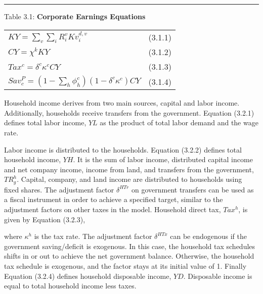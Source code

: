 \documentclass[12pt]{article}
\begin{document}
\newpage

\noindent\rule{\linewidth}{0.4pt}
\begin{center}
\begin{large}
{\centering Table 3.1: \textbf{Corporate Earnings Equations} \par}

\begin{tabular}{>{\raggedright}p{} l}

$KY = \displaystyle \sum_v \sum_i R^v_i Kv^{d, v}_i$ & (3.1.1)\\[15pt]

$CY = \chi^k K\!Y$ & (3.1.2)\\[15pt]

$Tax^c = \delta^c\kappa^cCY$ & (3.1.3) \\[15pt]

$Sav^P_c = \left(1- \displaystyle \sum_h \phi^c_h \right)(1-\delta^c\kappa^c)CY$ & (3.1.4) \\[15pt]
\hline
\end{tabular}
\end{large}
\end{center}

Household income derives from two main sources, capital and labor income. Additionally, households receive transfers from the government. Equation (3.2.1) defines total labor income, $YL$ as the product of total labor demand and the wage rate.

Labor income is distributed to the households. Equation (3.2.2) defines total household income, $YH$. It is the sum of labor income, distributed capital income and net company income, income from land, and transfers from the government, $TR_g^h$. Capital, company, and land income are distributed to households using fixed shares. The adjustment factor $\delta^{HTr}$ on government transfers can be used as a fiscal instrument in order to achieve a specified target, similar to the adjustment factors on other taxes in the model. Household direct tax, $Tax^h$, is given by Equation (3.2.3),

where $\kappa^h$ is the tax rate. The adjustment factor $\delta^{HTx}$ can be endogenous if the government saving/deficit is exogenous. In this case, the household tax schedules shifts in or out to achieve the net government balance. Otherwise, the household tax schedule is exogenous, and the factor stays at its initial value of 1. Finally Equation (3.2.4) defines household disposable income, $YD$. Disposable income is equal to total household income less taxes.
\end{document}
